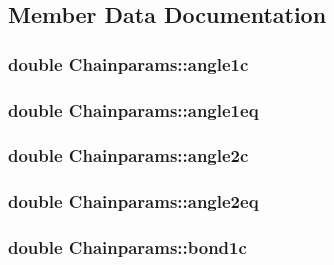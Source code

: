 \subsection{Member Data Documentation}
\hypertarget{struct_chainparams_ae377484ddc4411f11302f201d6cb9877}{
\subsubsection[{angle1c}]{\setlength{\rightskip}{0pt plus 5cm}double Chainparams\+::angle1c}}\label{struct_chainparams_ae377484ddc4411f11302f201d6cb9877}
\hypertarget{struct_chainparams_a537551faeb55ad7c9bd83c1943d8b97d}{
\subsubsection[{angle1eq}]{\setlength{\rightskip}{0pt plus 5cm}double Chainparams\+::angle1eq}}\label{struct_chainparams_a537551faeb55ad7c9bd83c1943d8b97d}
\hypertarget{struct_chainparams_ac53e6751edf1bfa8dfec837c54c4deab}{
\subsubsection[{angle2c}]{\setlength{\rightskip}{0pt plus 5cm}double Chainparams\+::angle2c}}\label{struct_chainparams_ac53e6751edf1bfa8dfec837c54c4deab}
\hypertarget{struct_chainparams_a68eb658f0342e48c3caec8397888f580}{
\subsubsection[{angle2eq}]{\setlength{\rightskip}{0pt plus 5cm}double Chainparams\+::angle2eq}}\label{struct_chainparams_a68eb658f0342e48c3caec8397888f580}
\hypertarget{struct_chainparams_a2ea341d92e24f590f56cf0d27c6d3969}{
\subsubsection[{bond1c}]{\setlength{\rightskip}{0pt plus 5cm}double Chainparams\+::bond1c}}\label{struct_chainparams_a2ea341d92e24f590f56cf0d27c6d3969}
